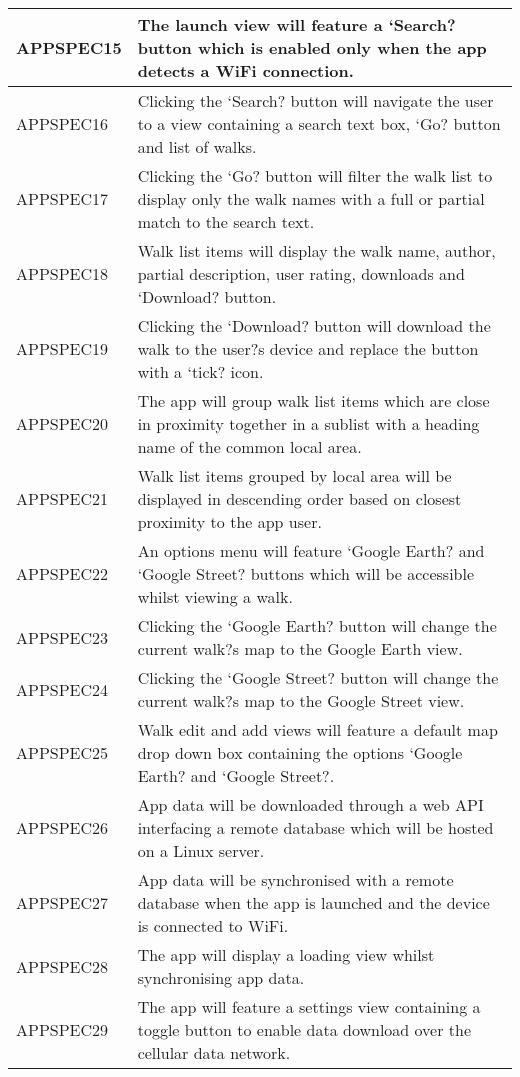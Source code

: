 \documentclass[11pt,a4paper]{article}
\begin{document}
\begin{longtable}{|p{2.5cm}p{13cm}|}
APPSPEC15 & The launch view will feature a `Search? button which is enabled only when the app detects a WiFi connection. \\ \hline
APPSPEC16 & Clicking the `Search? button will navigate the user to a view containing a search text box, `Go? button and list of walks. \\ \hline
APPSPEC17 & Clicking the `Go? button will filter the walk list to display only the walk names with a full or partial match to the search text. \\ \hline
APPSPEC18 & Walk list items will display the walk name, author, partial description, user rating, downloads and `Download? button. \\ \hline
APPSPEC19 & Clicking the `Download? button will download the walk to the user?s device and replace the button with a `tick? icon. \\ \hline
APPSPEC20 & The app will group walk list items which are close in proximity together in a sublist with a heading name of the common local area. \\ \hline
APPSPEC21 & Walk list items grouped by local area will be displayed in descending order based on closest proximity to the app user. \\ \hline
APPSPEC22 & An options menu will feature `Google Earth? and `Google Street? buttons which will be accessible whilst viewing a walk. \\ \hline
APPSPEC23 & Clicking the `Google Earth? button will change the current walk?s map to the Google Earth view. \\ \hline
APPSPEC24 & Clicking the `Google Street? button will change the current walk?s map to the Google Street view. \\ \hline
APPSPEC25 & Walk edit and add views will feature a default map drop down box containing the options `Google Earth? and `Google Street?. \\ \hline
APPSPEC26 & App data will be downloaded through a web API interfacing a remote database which will be hosted on a Linux server.  \\ \hline
APPSPEC27 & App data will be synchronised with a remote database when the app is launched and the device is connected to WiFi. \\ \hline
APPSPEC28 & The app will display a loading view whilst synchronising app data. \\ \hline
APPSPEC29 & The app will feature a settings view containing a toggle button to enable data download over the cellular data network. \\ \hline

\end{longtable}
\end{document}
